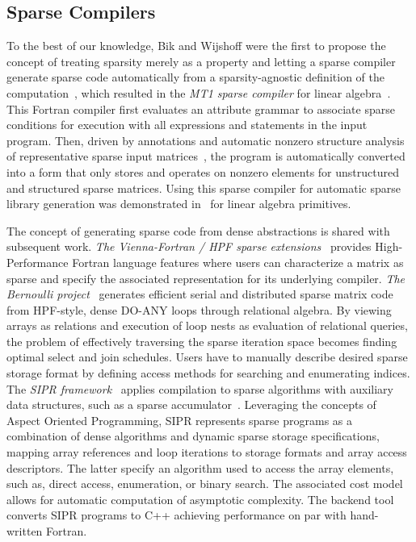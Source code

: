 \documentclass[10pt]{article}
\begin{document}
\subsection{Sparse Compilers}

To the best of our knowledge, Bik and Wijshoff were the first to propose the concept of treating sparsity merely as a property and letting a sparse compiler generate sparse code automatically from a sparsity-agnostic definition of the computation~\cite{bikjpdc}, which resulted in the \emph{MT1 sparse compiler} for linear algebra~\cite{drbik,biktpds}. This Fortran compiler first evaluates an attribute grammar to associate sparse conditions for execution with all expressions and statements in the input program. Then, driven by annotations and automatic nonzero structure analysis of representative sparse input matrices~\cite{biksicomp}, the program is automatically converted into a form that only stores and operates on nonzero elements for unstructured and structured sparse matrices. Using this sparse compiler for automatic sparse library generation was demonstrated in~\cite{biktms} for linear algebra primitives.

The concept of generating sparse code from dense abstractions is shared with subsequent work. \emph{The Vienna-Fortran / HPF sparse extensions}~\cite{ujaldon1997hpf-sparse-extension} provides High-Performance Fortran language features where users can characterize a matrix as sparse and specify the associated representation for its underlying compiler. \emph{The Bernoulli project}~\cite{kotlyar1997bernoulli,mateev2000generic-programming} generates efficient serial and distributed sparse matrix code from HPF-style, dense DO-ANY loops through relational algebra. By viewing arrays as relations and execution of loop nests as evaluation of relational queries, the problem of effectively traversing the sparse iteration space becomes finding optimal select and join schedules. Users have to manually describe desired sparse storage format by defining access methods for searching and enumerating indices. The \emph{SIPR framework}~\cite{pugh1998sipr} applies compilation to sparse algorithms with auxiliary data structures, such as a sparse accumulator~\cite{gilbert1992spa}. Leveraging the concepts of Aspect Oriented Programming, SIPR represents sparse programs as a combination of dense algorithms and dynamic sparse storage specifications, mapping array references and loop iterations to storage formats and array access descriptors. The latter specify an algorithm used to access the array elements, such as, direct access, enumeration, or binary search. The associated cost model allows for automatic computation of asymptotic complexity. The backend tool converts SIPR programs to C++ achieving performance on par with hand-written Fortran.
\end{document}
